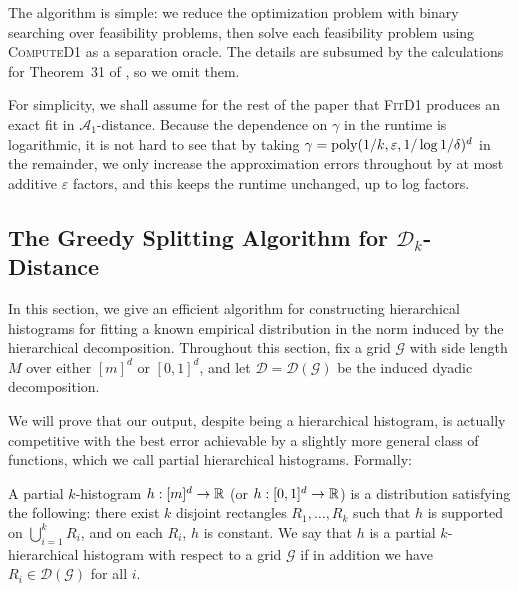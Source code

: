 \documentclass[final,12pt]{colt2018} %
\newcommand{\eps}{\varepsilon}
\newcommand{\hier}{\mathcal{D}}
\newcommand{\calG}{\mathcal{G}}
\newcommand{\A}{\mathcal{A}}
\newcommand{\new}[1]{{\color{red} #1}}
\newcommand{\new}[1]{{#1}}
\begin{document}
The algorithm is simple: we reduce the optimization problem 
with binary searching over feasibility problems, then solve each feasibility problem 
using \textsc{ComputeD1} as a separation oracle.
The details are subsumed by the calculations for Theorem~31 of \cite{ADLS17}, so we omit them.

For simplicity, we shall assume for the rest of the paper that \textsc{FitD1} produces an exact fit in $\A_1$-distance.
Because the dependence on $\gamma$ in the runtime is logarithmic, 
it is not hard to see that by taking $\gamma = \poly (1/k, \eps, 1 / \log 1 / \delta)^d$ in the remainder, 
we only increase the approximation errors throughout by at most additive $\eps$ factors, 
and this keeps the runtime unchanged, up to log factors.

\subsection{The Greedy Splitting Algorithm for $\hier_k$-Distance}
In this section, we give an efficient algorithm for constructing 
hierarchical histograms for fitting a known empirical distribution 
in the norm induced by the hierarchical decomposition.
Throughout this section, fix a grid $\calG$ with side length $M$ 
over either $[m]^d$ or $[0,1]^d$, and let $\hier = \hier(\calG)$ 
be the induced dyadic decomposition.

We will prove that our output, despite being a hierarchical histogram, is actually competitive 
with the best error achievable by a slightly more general class of functions, 
which we call partial hierarchical histograms.
Formally:
\begin{definition}
A partial $k$-histogram $h: [m]^d \to \operatorname{\mathbb{R}}$ (or $h: [0, 1]^d \to \operatorname{\mathbb{R}}$) 
is a distribution \new{satisfying the following:} there exist $k$ disjoint rectangles $R_1, \ldots, R_k$ 
such that $h$ is supported on $\bigcup_{i = 1}^k R_i$, and on each $R_i$, $h$ is constant.
We say that $h$ is a partial $k$-hierarchical histogram 
with respect to a grid $\calG$ if in addition we have $R_i \in \hier (\calG)$ for all $i$.
\end{definition}
\end{document}
